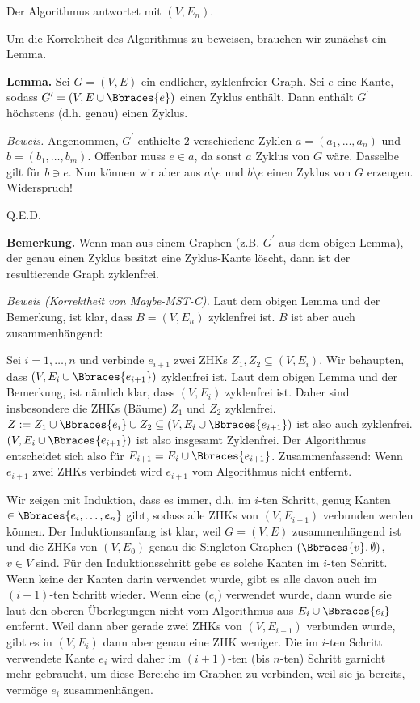 \begin{solution}
\begin{enumerate}[label = (\Alph*)]
    Der Algorithmus antwortet mit $(V, E_n)$.

    Um die Korrektheit des Algorithmus zu beweisen, brauchen wir zunächst ein Lemma.

    \textbf{Lemma.}
    Sei $G = (V, E)$ ein endlicher, zyklenfreier Graph.
    Sei $e$ eine Kante, sodass $G^\prime = (V, E \cup \Bbraces{e})$ einen Zyklus enthält.
    Dann enthält $G^\prime$ höchstens (d.h. genau) einen Zyklus.

    \textit{Beweis.}
    Angenommen, $G^\prime$ enthielte $2$ verschiedene Zyklen $a = (a_1, \dots, a_n)$ und $b = (b_1, \dots, b_m)$.
    Offenbar muss $e \in a$, da sonst $a$ Zyklus von $G$ wäre.
    Dasselbe gilt für $b \ni e$.
    Nun können wir aber aus $a \setminus e$ und $b \setminus e$ einen Zyklus von $G$ erzeugen.
    Widerspruch!

    Q.E.D.

    \textbf{Bemerkung.}
    Wenn man aus einem Graphen (z.B. $G^\prime$ aus dem obigen Lemma), der genau einen Zyklus besitzt eine Zyklus-Kante löscht, dann ist der resultierende Graph zyklenfrei.

    \textit{Beweis (Korrektheit von Maybe-MST-C).}
    Laut dem obigen Lemma und der Bemerkung, ist klar, dass $B = (V, E_n)$ zyklenfrei ist.
    $B$ ist aber auch zusammenhängend:

    Sei $i = 1, \dots, n$ und verbinde $e_{i+1}$ zwei ZHKs $Z_1, Z_2 \subseteq (V, E_i)$.
    Wir behaupten, dass $(V, E_i \cup \Bbraces{e_{i+1}})$ zyklenfrei ist.
    Laut dem obigen Lemma und der Bemerkung, ist nämlich klar, dass $(V, E_i)$ zyklenfrei ist.
    Daher sind insbesondere die ZHKs (Bäume) $Z_1$ und $Z_2$ zyklenfrei.
    $Z := Z_1 \cup \Bbraces{e_i} \cup Z_2 \subseteq (V, E_i \cup \Bbraces{e_{i+1}})$ ist also auch zyklenfrei.
    $(V, E_i \cup \Bbraces{e_{i+1}})$ ist also insgesamt Zyklenfrei.
    Der Algorithmus entscheidet sich also für $E_{i+1} = E_i \cup \Bbraces{e_{i+1}}$.
    Zusammenfassend:
    Wenn $e_{i+1}$ zwei ZHKs verbindet wird $e_{i+1}$ vom Algorithmus nicht entfernt.

    Wir zeigen mit Induktion, dass es immer, d.h. im $i$-ten Schritt, genug Kanten $\in \Bbraces{e_i, \dots, e_n}$ gibt, sodass alle ZHKs von $(V, E_{i-1})$ verbunden werden können.
    Der Induktionsanfang ist klar, weil $G = (V, E)$ zusammenhängend ist und die ZHKs von $(V, E_0)$ genau die Singleton-Graphen $(\Bbraces{v}, \emptyset)$, $v \in V$ sind.
    Für den Induktionsschritt gebe es solche Kanten im $i$-ten Schritt.
    Wenn keine der Kanten darin verwendet wurde, gibt es alle davon auch im $(i+1)$-ten Schritt wieder.
    Wenn eine ($e_i$) verwendet wurde, dann wurde sie laut den oberen Überlegungen nicht vom Algorithmus aus $E_i \cup \Bbraces{e_i}$ entfernt.
    Weil dann aber gerade zwei ZHKs von $(V, E_{i-1})$ verbunden wurde, gibt es in $(V, E_i)$ dann aber genau eine ZHK weniger.
    Die im $i$-ten Schritt verwendete Kante $e_i$ wird daher im $(i+1)$-ten (bis $n$-ten) Schritt garnicht mehr gebraucht, um diese Bereiche im Graphen zu verbinden, weil sie ja bereits, vermöge $e_i$ zusammenhängen.


\end{enumerate}
\end{solution}
